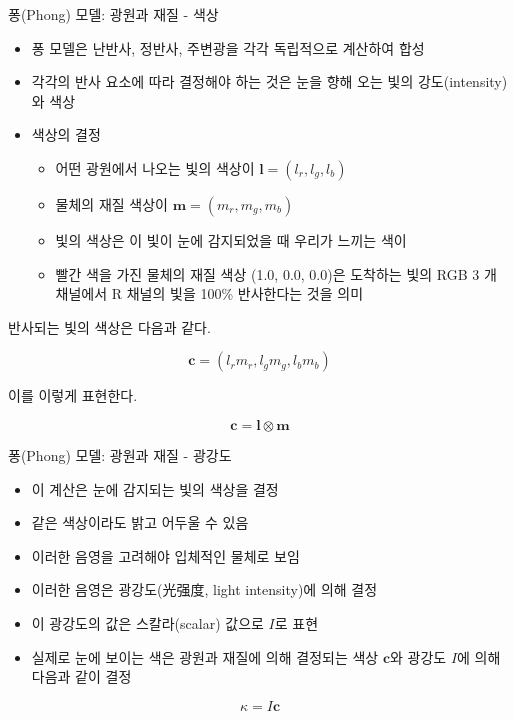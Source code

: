 \documentclass{beamer}
\begin{document}
\begin{frame}[fragile]{퐁(Phong) 모델: 광원과 재질 - 색상}

\begin{itemize}
\item 퐁 모델은 난반사, 정반사, 주변광을 각각 독립적으로 계산하여 합성
\item 각각의 반사 요소에 따라 결정해야 하는 것은 눈을 향해 오는 빛의 강도(intensity)와 색상
\item 색상의 결정
	\begin{itemize}
	\item 어떤 광원에서 나오는 빛의 색상이 ${\mathbf l} = (l_r, l_g, l_b)$
	\item 물체의 재질 색상이 ${\mathbf m} = (m_r, m_g, m_b)$
	\item 빛의 색상은 이 빛이 눈에 감지되었을 때 우리가 느끼는 색이
	\item 빨간 색을 가진 물체의 재질 색상 (1.0, 0.0, 0.0)은 도착하는 빛의 RGB 3 개 채널에서 R 채널의 빛을 100\% 반사한다는 것을 의미
	\end{itemize}
\end{itemize}

반사되는 빛의 색상은 다음과 같다.

$$\mathbf c = (l_r m_r, l_g m_g, l_b m_b)$$

이를 이렇게 표현한다.

$$\mathbf c = \mathbf l \otimes \mathbf m $$

\end{frame}


\begin{frame}[fragile]{퐁(Phong) 모델: 광원과 재질 - 광강도}

\begin{itemize}
\item 이 계산은 눈에 감지되는 빛의 색상을 결정
\item 같은 색상이라도 밝고 어두울 수 있음
\item 이러한 음영을 고려해야 입체적인 물체로 보임
\item 이러한 음영은 광강도(光强度, light intensity)에 의해 결정
\item 이 광강도의 값은 스칼라(scalar) 값으로 $I$로 표현
\item 실제로 눈에 보이는 색은 광원과 재질에 의해 결정되는 색상 $\mathbf c$와 광강도 $I$에 의해 다음과 같이 결정
\end{itemize}

$$\kappa = I \mathbf c$$

\end{frame}
\end{document}
